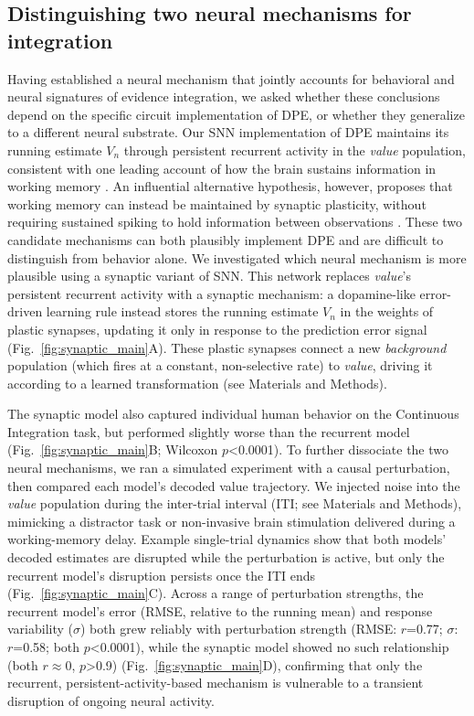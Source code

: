 \documentclass[12pt]{article}
\begin{document}
\subsection{Distinguishing two neural mechanisms for integration}
Having established a neural mechanism that jointly accounts for behavioral and neural signatures of evidence integration, we asked whether these conclusions depend on the specific circuit implementation of DPE, or whether they generalize to a different neural substrate. Our SNN implementation of DPE maintains its running estimate $V_n$ through persistent recurrent activity in the \textit{value} population, consistent with one leading account of how the brain sustains information in working memory \cite{wang2002probabilistic, wang2008decision}. An influential alternative hypothesis, however, proposes that working memory can instead be maintained by synaptic plasticity, without requiring sustained spiking to hold information between observations \cite{mongillo2008synaptic, stokes2015activity}. These two candidate mechanisms can both plausibly implement DPE and are difficult to distinguish from behavior alone. We investigated which neural mechanism is more plausible using a synaptic variant of SNN. This network replaces \textit{value}'s persistent recurrent activity with a synaptic mechanism: a dopamine-like error-driven learning rule instead stores the running estimate $V_n$ in the weights of plastic synapses, updating it only in response to the prediction error signal (Fig.~\ref{fig:synaptic_main}A). These plastic synapses connect a new \textit{background} population (which fires at a constant, non-selective rate) to \textit{value}, driving it according to a learned transformation (see Materials and Methods).

The synaptic model also captured individual human behavior on the Continuous Integration task, but performed slightly worse than the recurrent model (Fig.~\ref{fig:synaptic_main}B; Wilcoxon $p$<0.0001). To further dissociate the two neural mechanisms, we ran a simulated experiment with a causal perturbation, then compared each model's decoded value trajectory. We injected noise into the \textit{value} population during the inter-trial interval (ITI; see Materials and Methods), mimicking a distractor task or non-invasive brain stimulation delivered during a working-memory delay. Example single-trial dynamics show that both models' decoded estimates are disrupted while the perturbation is active, but only the recurrent model's disruption persists once the ITI ends (Fig.~\ref{fig:synaptic_main}C). Across a range of perturbation strengths, the recurrent model's error (RMSE, relative to the running mean) and response variability ($\sigma$) both grew reliably with perturbation strength (RMSE: $r$=0.77; $\sigma$: $r$=0.58; both $p$<0.0001), while the synaptic model showed no such relationship (both $r\approx0$, $p$>0.9) (Fig.~\ref{fig:synaptic_main}D), confirming that only the recurrent, persistent-activity-based mechanism is vulnerable to a transient disruption of ongoing neural activity.
\end{document}
